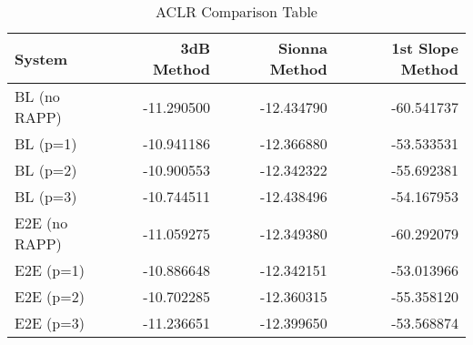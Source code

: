 \begin{table}
\caption{ACLR Comparison Table}
\label{tab:aclr_table}
\begin{tabular}{lrrr}
\toprule
System & 3dB Method & Sionna Method & 1st Slope Method \\
\midrule
BL (no RAPP) & -11.290500 & -12.434790 & -60.541737 \\
BL (p=1) & -10.941186 & -12.366880 & -53.533531 \\
BL (p=2) & -10.900553 & -12.342322 & -55.692381 \\
BL (p=3) & -10.744511 & -12.438496 & -54.167953 \\
E2E (no RAPP) & -11.059275 & -12.349380 & -60.292079 \\
E2E (p=1) & -10.886648 & -12.342151 & -53.013966 \\
E2E (p=2) & -10.702285 & -12.360315 & -55.358120 \\
E2E (p=3) & -11.236651 & -12.399650 & -53.568874 \\
\bottomrule
\end{tabular}
\end{table}
